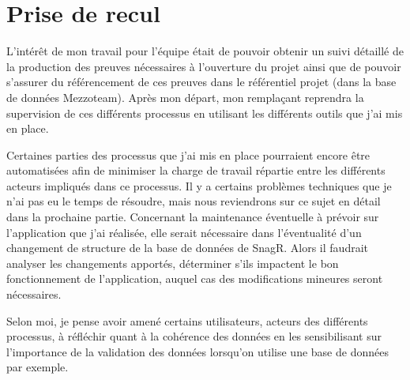 \section{Prise de recul}
L'intérêt de mon travail pour l'équipe était de pouvoir obtenir un suivi détaillé de la production des preuves nécessaires à l'ouverture du projet ainsi que de pouvoir s'assurer du référencement de ces preuves dans le référentiel projet (dans la base de données \gls{Mezzoteam}). Après mon départ, mon remplaçant reprendra la supervision de ces différents processus en utilisant les différents outils que j'ai mis en place.

Certaines parties des processus que j'ai mis en place pourraient encore être automatisées afin de minimiser la charge de travail répartie entre les différents acteurs impliqués dans ce processus.
Il y a certains problèmes techniques que je n'ai pas eu le temps de résoudre, mais nous reviendrons sur ce sujet en détail dans la prochaine partie.
Concernant la maintenance éventuelle à prévoir sur l'application que j'ai réalisée, elle serait nécessaire dans l'éventualité d'un changement de structure de la base de données de \gls{SnagR}.
Alors il faudrait analyser les changements apportés, déterminer s’ils impactent le bon fonctionnement de l'application, auquel cas des modifications mineures seront nécessaires.


Selon moi, je pense avoir amené certains utilisateurs, acteurs des différents processus, à réfléchir quant à la cohérence des données en les sensibilisant sur l'importance de la validation des données lorsqu'on utilise une base de données par exemple.
